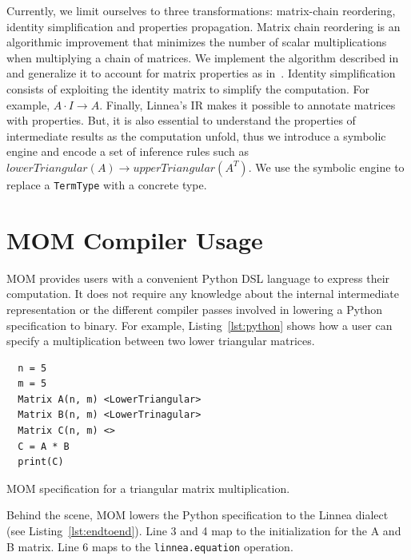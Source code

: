 \documentclass[conference]{IEEEtran}
\begin{document}
Currently, we limit ourselves to three transformations: matrix-chain
reordering, identity simplification and properties propagation. Matrix chain
reordering is an algorithmic improvement that minimizes the number of scalar
multiplications when multiplying a chain of matrices. We implement the
algorithm described in~\cite{cormen2009introduction} and generalize it to
account for matrix properties as in~\cite{barthels:21, 10.1145/3168804}. Identity
simplification consists of exploiting the identity matrix to simplify the
computation. For example, $A \cdot I \rightarrow A$.  Finally, Linnea's IR
makes it possible to annotate matrices with properties. But, it is also
essential to understand the properties of intermediate results as the
computation unfold, thus we introduce a symbolic engine and encode a set of
inference rules such as $lowerTriangular(A) \rightarrow upperTriangular(A^T)$.
We use the symbolic engine to replace a \texttt{TermType} with a concrete type.

\section{MOM Compiler Usage}

MOM provides users with a convenient Python DSL language to express their
computation. It does not require any knowledge about the internal intermediate
representation or the different compiler passes involved in lowering a Python
specification to binary. For example, Listing~\ref{lst:python} shows how a user
can specify a multiplication between two lower triangular matrices. 

\begin{listing}[]
\begin{center}
\begin{minipage}[]{0.5\textwidth}
\begin{verbatim}
  n = 5
  m = 5
  Matrix A(n, m) <LowerTriangular>
  Matrix B(n, m) <LowerTrinagular>
  Matrix C(n, m) <>
  C = A * B
  print(C)
\end{verbatim}
\end{minipage}
\vspace{-0.7em}
\caption{MOM specification for a triangular matrix multiplication.}
\label{lst:python}
\end{center}
\end{listing}

Behind the scene, MOM lowers the Python specification to the Linnea dialect
(see Listing~\ref{lst:endtoend}).  Line 3 and 4 map to the initialization for
the A and B matrix. Line 6 maps to the \texttt{linnea.equation} operation. 
\end{document}
